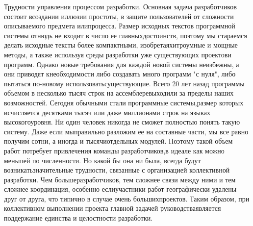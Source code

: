 \documentclass[10pt]{article}
\begin{document}
Трудности управления процессом разработки. Основная задача разработчиков состоит в\linebreak  создании иллюзии простоты, в защите пользователей от сложности описываемого предмета или\linebreak  процесса. Размер исходных текстов программной системы отнюдь не входит в число ее главных\linebreak  достоинств, поэтому мы стараемся делать исходные тексты более компактными, изобретая\linebreak  хитроумные и мощные методы, а также используя среды разработки уже существующих проектов\linebreak  и программ. Однако новые требования для каждой новой системы неизбежны, а они приводят к\linebreak  необходимости либо создавать много программ "с нуля", либо пытаться по-новому использовать\linebreak  существующие. Всего 20 лет назад программы объемом в несколько тысяч строк на ассемблере\linebreak  выходили за пределы наших возможностей. Сегодня обычными стали программные системы,\linebreak  размер которых исчисляется десятками тысяч или даже миллионами строк на языках высокого\linebreak  уровня. Ни один человек никогда не сможет полностью понять такую систему. Даже если мы\linebreak  правильно разложим ее на составные части, мы все равно получим сотни, а иногда и тысячи\linebreak  отдельных модулей. Поэтому такой объем работ потребует привлечения команды разработчиков,\linebreak  в идеале как можно меньшей по численности. Но какой бы она ни была, всегда будут возникать\linebreak  значительные трудности, связанные с организацией коллективной разработки. Чем больше\linebreak  разработчиков, тем сложнее связи между ними и тем сложнее координация, особенно если\linebreak  участники работ географически удалены друг от друга, что типично в случае очень больших\linebreak  проектов. Таким образом, при коллективном выполнении проекта главной задачей руководства\linebreak  является поддержание единства и целостности разработки. 
\end{document}
